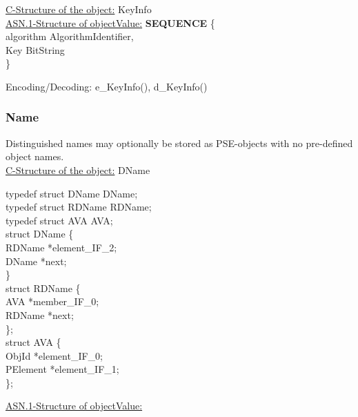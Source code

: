 \underline{C-Structure of the object:} KeyInfo \\


\underline{ASN.1-Structure of objectValue:} 
{\small
\bvtab
\1 {\bf SEQUENCE} \{  \\
\4 algorithm    \2 AlgorithmIdentifier,    \\
\4 Key 		\2 BitString            \\
\1 \} \\
\evtab
}

Encoding/Decoding: e\_KeyInfo(), d\_KeyInfo()


\subsubsection{Name}
Distinguished names may optionally be stored as PSE-objects with no pre-defined object names. \\

\underline{C-Structure of the object:} DName

{\small
\bvtab
\2 typedef struct DName DName;                  \\
\2 typedef struct RDName RDName;                \\
\2 typedef struct AVA AVA;                      \\
\2 struct DName \{                              \\
\4        RDName       \3 *element\_IF\_2;      \\
\4        DName        \3 *next;                \\
\2 \}                                           \\ [1em]
\2 struct RDName \{                             \\
\4        AVA          \3 *member\_IF\_0;       \\
\4        RDName       \3 *next;                \\
\2 \};                                          \\ [1em]
\2 struct AVA \{                                \\ 
\4        ObjId  \3 *element\_IF\_0;            \\
\4        PElement     \3 *element\_IF\_1;      \\
\2 \};                                          \\
\evtab
}

\underline{ASN.1-Structure of objectValue:}

